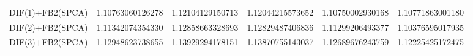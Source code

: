 \begin{table}[h]
\begin{adjustbox}{totalheight=\baselineskip}
\begin{tabular}{lSSSSS}
DIF(1)+FB2(SPCA) & 1.10763060126278 & 1.12104129150713 & 1.12044215573652 & 1.10750002930168 & 1.10771863001180 \\ 
DIF(2)+FB2(SPCA) & 1.11342074354330 & 1.12858663328693 & 1.12829487406836 & 1.11299206493377 & 1.10376595017935 \\ 
DIF(3)+FB2(SPCA) & 1.12948623738655 & 1.13929294178151 & 1.13870755143037 & 1.12689676243759 & 1.12225425172475 \\ \bottomrule 
\end{tabular}
\end{adjustbox}
\end{table}

